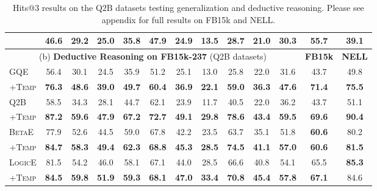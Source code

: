 \begin{table}[!htp]
\begin{tabular*}{\linewidth}{@{}ccccccccccccc@{}}
& \textbf{46.6}      & \textbf{29.2}      & \textbf{25.0}      & \textbf{35.8} & \textbf{47.9}      & \textbf{24.9}      & \textbf{13.5}      & \textbf{28.7}
& \textbf{21.0}      & \textbf{30.3}      & \textbf{55.7}      & \textbf{39.1} \\
\midrule
\multicolumn{11}{c|}{(b) \textbf{Deductive Reasoning on FB15k-237} (Q2B datasets)} & \textbf{FB15k} & \textbf{NELL}\\
\midrule
\multicolumn{1}{l}{GQE}     
& 56.4      & 30.1      & 24.5      & 35.9      & 51.2      & 25.1      & 13.0      & 25.8 & 22.0      & 31.6      & 43.7      & 49.8 \\
\multicolumn{1}{c}{+\textsc{Temp}}     
& \textbf{76.3}      & \textbf{48.6}      & \textbf{39.0}      & \textbf{49.7}      
& \textbf{60.4}      & \textbf{36.9}      & \textbf{22.1}      & \textbf{59.0}
& \textbf{36.3}      & \textbf{47.6}      & \textbf{71.4}      & \textbf{75.5} \\
\midrule
\multicolumn{1}{l}{Q2B}     
& 58.5      & 34.3      & 28.1      & 44.7      & 62.1      & 23.9      & 11.7      & 40.5 & 22.0      & 36.2      & 43.7      & 51.1 \\
\multicolumn{1}{c}{+\textsc{Temp}}     
& \textbf{87.2}      & \textbf{59.6}      & \textbf{47.9}      & \textbf{67.2}      
& \textbf{72.7}      & \textbf{49.1}      & \textbf{29.8}      & \textbf{78.6} 
& \textbf{43.4}      & \textbf{59.5}      & \textbf{69.6}      & \textbf{90.4} \\
\midrule
\multicolumn{1}{l}{\textsc{BetaE}}     
& 77.9      & 52.6      & 44.5      & 59.0      & 67.8      & 42.2      & 23.5      & 63.7 
& 35.1      & 51.8      & \textbf{60.6}      & 80.2 \\
\multicolumn{1}{c}{+\textsc{Temp}}     
& \textbf{84.7}      & \textbf{58.3}      & \textbf{49.4}      & \textbf{62.3}      
& \textbf{68.8}      & \textbf{45.3}      & \textbf{28.5}      & \textbf{74.5}
& \textbf{41.1}      & \textbf{57.0}      & \textbf{60.6}      & \textbf{81.5} \\
\midrule
\multicolumn{1}{l}{\textsc{LogicE}}     
& 81.5      & 54.2      & 46.0      & 58.1      & 67.1      & 44.0      & 28.5      & 66.6 
& 40.8      & 54.1      & 65.5      & \textbf{85.3} \\
\multicolumn{1}{c}{+\textsc{Temp}}     
& \textbf{84.5}      & \textbf{59.8}      & \textbf{51.9}      & \textbf{59.3}      
& \textbf{68.1}      & \textbf{47.0}      & \textbf{33.4}      & \textbf{70.8}
& \textbf{45.4}      & \textbf{57.8}      & \textbf{67.1}      & 84.6 \\
\bottomrule
\end{tabular*}
\caption{Hits@3 results on the Q2B datasets testing generalization and deductive reasoning. Please see appendix  for full results on FB15k and NELL.}
\label{table_1}
\end{table}

